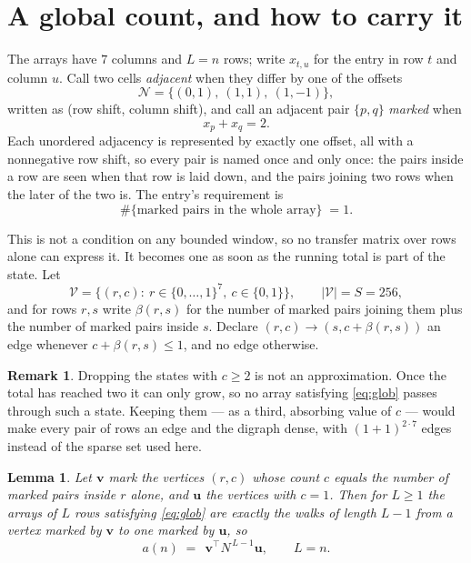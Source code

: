 \documentclass[11pt,a4paper]{article}
\theoremstyle{plain}
\newtheorem{lemma}[theorem]{Lemma}
\theoremstyle{definition}
\newtheorem{remark}[theorem]{Remark}
\begin{document}
\section{A global count, and how to carry it}

The arrays have $7$ columns and $L=n$ rows; write $x_{t,u}$ for the entry in
row $t$ and column $u$. Call two cells \emph{adjacent} when they differ by one of the
offsets
\[
\mathcal N=\{(0,1),\ (1,1),\ (1,-1)\},
\]
written as (row shift, column shift), and call an adjacent pair $\{p,q\}$
\emph{marked} when
\[
x_{p}+x_{q}=2 .
\]
Each unordered adjacency is represented by exactly one offset, all with a nonnegative row
shift, so every pair is named once and only once: the pairs inside a row are seen when
that row is laid down, and the pairs joining two rows when the later of the two is. The
entry's requirement is
\begin{equation}\label{eq:glob}
\#\{\text{marked pairs in the whole array}\}\;=1.
\end{equation}

This is not a condition on any bounded window, so no transfer matrix over rows alone can
express it. It becomes one as soon as the running total is part of the state. Let
\[
\mathcal V=\bigl\{(r,c):\ r\in\{0,\dots,1\}^{7},\ c\in\{0,1\}\bigr\},
\qquad |\mathcal V|=S=256,
\]
and for rows $r,s$ write $\beta(r,s)$ for the number of marked pairs joining them plus the
number of marked pairs inside $s$. Declare $(r,c)\to(s,c+\beta(r,s))$ an edge whenever
$c+\beta(r,s)\le1$, and no edge otherwise.

\begin{remark}
Dropping the states with $c\ge2$ is not an approximation. Once the total has reached two it
can only grow, so no array satisfying \eqref{eq:glob} passes through such a state. Keeping
them --- as a third, absorbing value of $c$ --- would make every pair of rows an edge and
the digraph dense, with $(1+1)^{2\cdot7}$ edges instead of the sparse set used here.
\end{remark}

\begin{lemma}\label{lem:walk}
Let $\mathbf{v}$ mark the vertices $(r,c)$ whose count $c$ equals the number of marked pairs
inside $r$ alone, and $\mathbf{u}$ the vertices with $c=1$. Then for $L\ge1$ the arrays
of $L$ rows satisfying \eqref{eq:glob} are exactly the walks of length $L-1$ from a
vertex marked by $\mathbf{v}$ to one marked by $\mathbf{u}$, so
\[
a(n)\;=\;\,\mathbf{v}^{\!\top}N^{\,L-1}\mathbf{u},\qquad L=n .
\]
\end{lemma}
\end{document}
